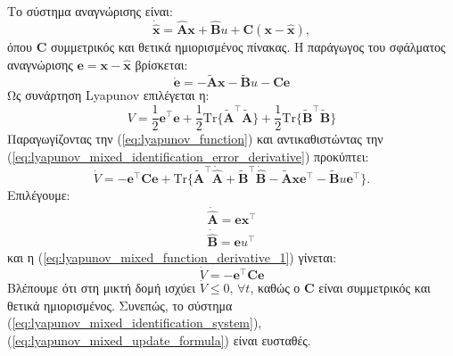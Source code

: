 \documentclass[a4paper,12pt]{article}
\begin{document}
Το σύστημα αναγνώρισης είναι:
\begin{equation}
    \dot{\hat{\mathbf{x}}} = \hat{\mathbf{A}}\mathbf{x} + \hat{\mathbf{B}} u + 
    \mathbf{C}(\mathbf{x} - \hat{\mathbf{x}}),
    \label{eq:lyapunov_mixed_identification_system}
\end{equation}
όπου $\mathbf{C}$ συμμετρικός και θετικά ημιορισμένος πίνακας. Η παράγωγος του σφάλματος αναγνώρισης 
$\mathbf{e} = \mathbf{x} - \hat{\mathbf{x}}$ 
βρίσκεται:
\begin{equation}
    \dot{\mathbf{e}} = -\tilde{\mathbf{A}}\mathbf{x} - \tilde{\mathbf{B}}u - \mathbf{C}\mathbf{e}
    \label{eq:lyapunov_mixed_identification_error_derivative}
\end{equation}
Ως συνάρτηση Lyapunov επιλέγεται η:
\begin{equation}
    V = \frac{1}{2}\mathbf{e}^{\top}\mathbf{e} + 
    \frac{1}{2}\mathrm{Tr}\{\tilde{\mathbf{A}}^{\top}\tilde{\mathbf{A}}\}
    + \frac{1}{2}\mathrm{Tr}\{\tilde{\mathbf{B}}^{\top}\tilde{\mathbf{B}}\}
    \label{eq:lyapunov_function}
\end{equation}
Παραγωγίζοντας την (\ref{eq:lyapunov_function}) και αντικαθιστώντας
την (\ref{eq:lyapunov_mixed_identification_error_derivative}) προκύπτει:
\begin{equation}
    \dot{V} = -\mathbf{e}^{\top}\mathbf{C}\mathbf{e} + 
    \mathrm{Tr}\{\tilde{\mathbf{A}}^{\top}\dot{\hat{\mathbf{A}}} + 
    \tilde{\mathbf{B}}^{\top}\dot{\hat{\mathbf{B}}} - 
    \tilde{\mathbf{A}}\mathbf{x}\mathbf{e}^{\top} - 
    \tilde{\mathbf{B}}u\mathbf{e}^{\top}\}.
    \label{eq:lyapunov_mixed_function_derivative_1}  
\end{equation}
Επιλέγουμε:
\begin{equation}
    \begin{aligned}
        \dot{\hat{\mathbf{A}}} = \mathbf{e}\mathbf{x}^{\top} \\ 
        \dot{\hat{\mathbf{B}}} = \mathbf{e}u^{\top}
    \end{aligned}
    \label{eq:lyapunov_mixed_update_formula}
\end{equation}
και η (\ref{eq:lyapunov_mixed_function_derivative_1}) γίνεται:
\begin{equation}
    \dot{V} = -\mathbf{e}^{\top}\mathbf{C}\mathbf{e}
    \label{eq:lyapunov_mixed_function_derivative_2}
\end{equation}
Βλέπουμε ότι στη μικτή δομή ισχύει $\dot{V} \leq 0, \, \forall t$, καθώς ο $\mathbf{C}$ είναι 
συμμετρικός και θετικά ημιορισμένος. Συνεπώς, το σύστημα (\ref{eq:lyapunov_mixed_identification_system}), 
(\ref{eq:lyapunov_mixed_update_formula}) είναι ευσταθές.
\end{document}
